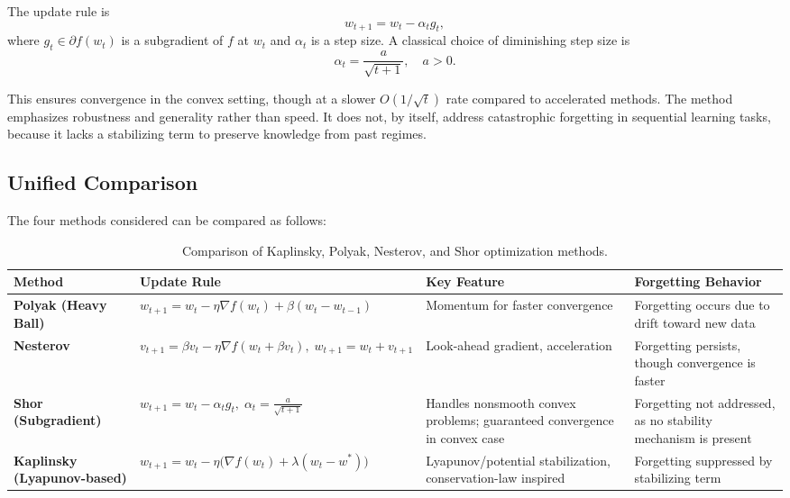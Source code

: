 \documentclass[12pt]{article}
\begin{document}
The update rule is
\[
    w_{t+1} = w_t - \alpha_t g_t,
\]
where $g_t \in \partial f(w_t)$ is a subgradient of $f$ at $w_t$ and $\alpha_t$
is a step size. A classical choice of diminishing step size is
\[
    \alpha_t = \frac{a}{\sqrt{t+1}}, \quad a > 0.
\]

This ensures convergence in the convex setting, though at a slower $O(1/\sqrt{t})$
rate compared to accelerated methods. The method emphasizes robustness and
generality rather than speed. It does not, by itself, address catastrophic forgetting
in sequential learning tasks, because it lacks a stabilizing term to preserve knowledge
from past regimes. 

\subsection{Unified Comparison}
The four methods considered can be compared as follows:

\begin{table}[h]
\centering
\renewcommand{\arraystretch}{1.2}
\setlength{\tabcolsep}{4pt}
\begin{tabular}{|p{3cm}|p{4cm}|p{4cm}|p{3cm}|}
\hline
\textbf{Method} & \textbf{Update Rule} & \textbf{Key Feature} & \textbf{Forgetting Behavior} \\
\hline
\textbf{Polyak (Heavy Ball)} & 
$w_{t+1} = w_t - \eta \nabla f(w_t) + \beta (w_t - w_{t-1})$ &
Momentum for faster convergence & Forgetting occurs due to drift toward new data \\
\hline
\textbf{Nesterov} &
$v_{t+1} = \beta v_t - \eta \nabla f(w_t + \beta v_t), \; w_{t+1} = w_t + v_{t+1}$ &
Look-ahead gradient, acceleration & Forgetting persists, though convergence is faster \\
\hline
\textbf{Shor (Subgradient)} &
$w_{t+1} = w_t - \alpha_t g_t, \; \alpha_t = \tfrac{a}{\sqrt{t+1}}$ &
Handles nonsmooth convex problems; guaranteed convergence in convex case & Forgetting not addressed, as no stability mechanism is present \\
\hline
\textbf{Kaplinsky (Lyapunov-based)} &
$w_{t+1} = w_t - \eta \big(\nabla f(w_t) + \lambda (w_t - w^*)\big)$ &
Lyapunov/potential stabilization, conservation-law inspired & Forgetting suppressed by stabilizing term \\
\hline
\end{tabular}
\caption{Comparison of Kaplinsky, Polyak, Nesterov, and Shor optimization methods.}
\end{table}
\end{document}

